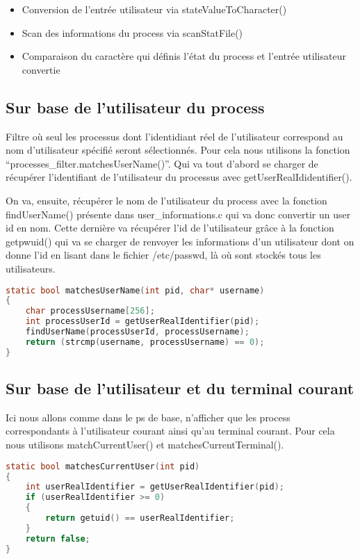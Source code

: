 \begin{itemize}
\item Conversion de l'entrée utilisateur via stateValueToCharacter()
\item Scan des informations du process via scanStatFile()
\item Comparaison du caractère qui définis l'état du process et l'entrée utilisateur convertie
\end{itemize}


\subsection{Sur base de l’utilisateur du process}
Filtre où seul les processus dont l’identidiant réel de l'utilisateur correspond au nom d'utilisateur spécifié seront sélectionnés. Pour cela nous utilisons la fonction “processes\_filter.matchesUserName()”. Qui va tout d’abord se charger de récupérer l’identifiant de l’utilisateur du processus avec getUserRealIdidentifier().

On va, ensuite, récupérer le nom de l'utilisateur du process avec la fonction findUserName() présente dans user\_informations.c qui va donc convertir un user id en nom. Cette dernière va récupérer l'id de l'utilisateur grâce à la fonction getpwuid() qui va se charger de renvoyer les informations d'un utilisateur dont on donne l'id en lisant dans le fichier /etc/passwd, là où sont stockés tous les utilisateurs.

\begin{lstlisting}[frame=single, language=c]
static bool matchesUserName(int pid, char* username)
{
    char processUsername[256];
    int processUserId = getUserRealIdentifier(pid);
    findUserName(processUserId, processUsername);
    return (strcmp(username, processUsername) == 0);
}
\end{lstlisting}



\subsection{Sur base de l’utilisateur et du terminal courant} 
Ici nous allons comme dans le ps de base, n'afficher que les process correspondants à l'utilisateur courant ainsi qu'au terminal courant. Pour cela nous utilisons matchCurrentUser() et matchesCurrentTerminal().

\begin{lstlisting}[frame=single, language=c]
static bool matchesCurrentUser(int pid)
{
    int userRealIdentifier = getUserRealIdentifier(pid);
    if (userRealIdentifier >= 0)
    {
        return getuid() == userRealIdentifier;
    }
    return false;
}
\end{lstlisting}

